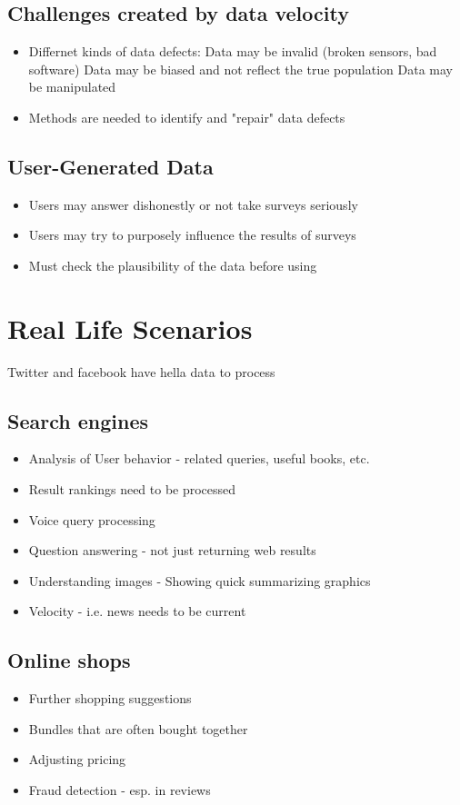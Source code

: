 \documentclass[10pt,a4paper]{scrreprt}
\begin{document}
\subsection{Challenges created by data velocity}
\begin{itemize}
	\item Differnet kinds of data defects:
		\subitem Data may be invalid (broken sensors, bad software)
		\subitem Data may be biased and not reflect the true population
		\subitem Data may be manipulated
	\item Methods are needed to identify and "repair" data defects
\end{itemize}

\subsection{User-Generated Data}
\begin{itemize}
	\item Users may answer dishonestly or not take surveys seriously
	\item Users may try to purposely influence the results of surveys
	\item Must check the plausibility of the data before using	
\end{itemize}

\section{Real Life Scenarios}
Twitter and facebook have hella data to process
\subsection{Search engines}
\begin{itemize}
	\item Analysis of User behavior - related queries, useful books, etc.
	\item Result rankings need to be processed
	\item Voice query processing
	\item Question answering - not just returning web results
	\item Understanding images - Showing quick summarizing graphics
	\item Velocity - i.e. news needs to be current
\end{itemize}
\subsection{Online shops}
\begin{itemize}
	\item Further shopping suggestions
	\item Bundles that are often bought together
	\item Adjusting pricing
	\item Fraud detection - esp. in reviews
\end{itemize}
\end{document}
